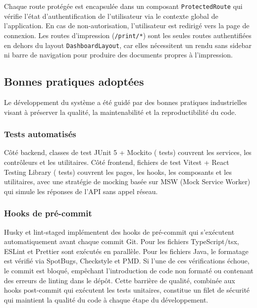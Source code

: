 Chaque route protégée est encapsulée dans un composant \texttt{ProtectedRoute} qui vérifie l'état d'authentification de l'utilisateur via le contexte global de l'application. En cas de non-autorisation, l'utilisateur est redirigé vers la page de connexion. Les routes d'impression (\texttt{/print/*}) sont les seules routes authentifiées en dehors du layout \texttt{DashboardLayout}, car elles nécessitent un rendu sans sidebar ni barre de navigation pour produire des documents propres à l'impression.

\subsection{Bonnes pratiques adoptées}
\label{ch4:bonnes_pratiques}

Le développement du système a été guidé par des bonnes pratiques industrielles visant à préserver la qualité, la maintenabilité et la reproductibilité du code.

\subsubsection{Tests automatisés}
\label{ch4:tests}

Côté backend,  classes de test JUnit 5 + Mockito ( tests) couvrent les services, les contrôleurs et les utilitaires. Côté frontend,  fichiers de test Vitest + React Testing Library ( tests) couvrent les pages, les hooks, les composants et les utilitaires, avec une stratégie de mocking basée sur MSW (Mock Service Worker) qui simule les réponses de l'API sans appel réseau.

\subsubsection{Hooks de pré-commit}
\label{ch4:hooks}

Husky et lint-staged implémentent des hooks de pré-commit qui s'exécutent automatiquement avant chaque commit Git. Pour les fichiers TypeScript/\gls{tsx}, ESLint et Prettier sont exécutés en parallèle. Pour les fichiers Java, le formatage est vérifié via SpotBugs, Checkstyle et PMD. Si l'une de ces vérifications échoue, le commit est bloqué, empêchant l'introduction de code non formaté ou contenant des erreurs de linting dans le dépôt. Cette barrière de qualité, combinée aux hooks post-commit qui exécutent les tests unitaires, constitue un filet de sécurité qui maintient la qualité du code à chaque étape du développement.

